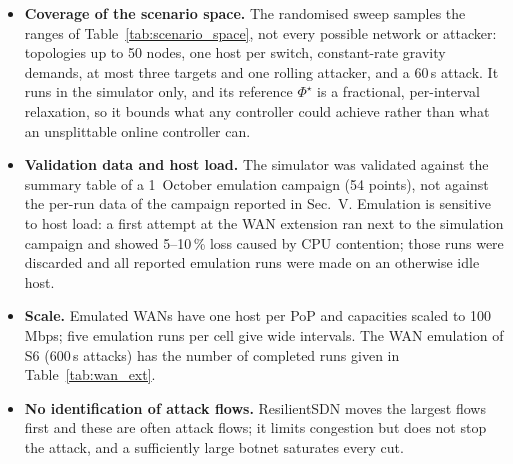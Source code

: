 \begin{itemize}
  and 11\,\% for TE-$\Phi$ (Sec.~\ref{sec:sweep}). A defence would need to stop moving traffic once
  the target follows it (e.g.\ by detecting re-targeting), which we have not implemented.
\item \textbf{Coverage of the scenario space.} The randomised sweep samples the ranges of
  Table~\ref{tab:scenario_space}, not every possible network or attacker: topologies up to 50
  nodes, one host per switch, constant-rate gravity demands, at most three targets and one rolling
  attacker, and a 60\,s attack. It runs in the simulator only, and its reference $\Phi^\star$ is a
  fractional, per-interval relaxation, so it bounds what any controller could achieve rather than
  what an unsplittable online controller can.
\item \textbf{Validation data and host load.} The simulator was validated against the summary
  table of a 1~October emulation campaign (54 points), not against the per-run data of the campaign
  reported in Sec.~V. Emulation is sensitive to host load: a first attempt at the WAN extension ran
  next to the simulation campaign and showed 5--10\,\% loss caused by CPU contention; those runs were
  discarded and all reported emulation runs were made on an otherwise idle host.
\item \textbf{Scale.} Emulated WANs have one host per PoP and capacities scaled to 100\,Mbps; five
  emulation runs per cell give wide intervals. The WAN emulation of S6 (600\,s attacks) has the
  number of completed runs given in Table~\ref{tab:wan_ext}.
\item \textbf{No identification of attack flows.} ResilientSDN moves the largest flows first and
  these are often attack flows; it limits congestion but does not stop the attack, and a
  sufficiently large botnet saturates every cut.
\end{itemize}
